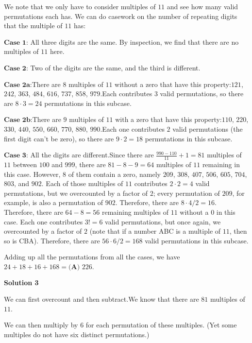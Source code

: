 \begin{enumerate}
We note that we only have to consider multiples of $11$ and see how many valid permutations each has. We can do casework on the number of repeating digits that the multiple of $11$ has:

 $\textbf{Case 1:}$ All three digits are the same. By inspection, we find that there are no multiples of $11$ here.

 $\textbf{Case 2:}$ Two of the digits are the same, and the third is different.

 $\textbf{Case 2a:}$There are $8$ multiples of $11$ without a zero that have this property:$121$, $242$, $363$, $484$, $616$, $737$, $858$, $979$.Each contributes $3$ valid permutations, so there are $8 \cdot 3 = 24$ permutations in this subcase.

 $\textbf{Case 2b:}$There are $9$ multiples of $11$ with a zero that have this property:$110$, $220$, $330$, $440$, $550$, $660$, $770$, $880$, $990$.Each one contributes $2$ valid permutations (the first digit can't be zero), so there are $9 \cdot 2 = 18$ permutations in this subcase.

 $\textbf{Case 3:}$ All the digits are different.Since there are $\frac{990-110}{11}+1 = 81$ multiples of $11$ between $100$ and $999$, there are $81-8-9 = 64$ multiples of $11$ remaining in this case. However, $8$ of them contain a zero, namely $209$, $308$, $407$, $506$, $605$, $704$, $803$, and $902$. Each of those multiples of $11$ contributes $2 \cdot 2=4$ valid permutations, but we overcounted by a factor of $2$; every permutation of $209$, for example, is also a permutation of $902$. Therefore, there are $8 \cdot 4 / 2 = 16$. Therefore, there are $64-8=56$ remaining multiples of $11$ without a $0$ in this case. Each one contributes $3! = 6$ valid permutations, but once again, we overcounted by a factor of $2$ (note that if a number ABC is a multiple of $11$, then so is CBA). Therefore, there are $56 \cdot 6 / 2 = 168$ valid permutations in this subcase.

 Adding up all the permutations from all the cases, we have $24+18+16+168 = \boxed{\textbf{(A) } 226}$.

 



\textbf{Solution 3}

We can first overcount and then subtract.We know that there are $81$ multiples of $11$.

 We can then multiply by $6$ for each permutation of these multiples. (Yet some multiples do not have six distinct permutations.)


\end{enumerate}
